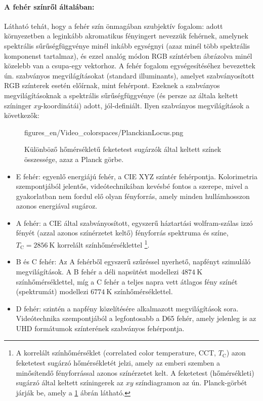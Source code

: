\paragraph{A fehér színről általában:\\}
Látható tehát, hogy a fehér szín önmagában szubjektív fogalom: adott környezetben a leginkább akromatikus fényingert nevezzük fehérnek, amelynek spektrális sűrűségfüggvénye minél inkább egységnyi (azaz minél több spektrális komponenst tartalmaz), és ezzel analóg módon RGB színtérben ábrázolva minél közelebb van a csupa-egy vektorhoz.
A fehér fogalom egységesítéséhez bevezettek ún. szabványos megvilágításokat (standard illuminants), amelyet szabványosított RGB  színterek esetén előírnak, mint fehérpont.
Ezeknek a szabványos megvilágításoknak a spektrális sűrűségfüggvénye (és persze az általa keltett színinger $xy$-koordinátái) adott, jól-definiált.
Ilyen szabványos megvilágítások a következők:
\begin{figure}[]
	\centering
	\begin{minipage}[c]{0.6\textwidth}
	\begin{overpic}[width = 0.9\columnwidth ]{figures_en/Video_colorspaces/PlanckianLocus.png}
	\end{overpic} \end{minipage}\hfill
	\begin{minipage}[c]{0.4\textwidth}
	\caption{Különböző hőmérsékletű feketetest sugárzók által keltett színek összessége, azaz a Planck görbe.}
	\label{Fig:planck}  \end{minipage}
\end{figure}
\begin{itemize}
\item E fehér: egyenlő energiájú fehér, a CIE XYZ színtér fehérpontja. Kolorimetria szempontjából jelentős, videótechnikában kevésbé fontos a szerepe, mivel a gyakorlatban nem fordul elő olyan fényforrás, amely minden hullámhosszon azonos energiával sugároz.
\item A fehér: a CIE által szabványosított, egyszerű háztartási wolfram-szálas izzó fényét (azzal azonos színérzetet keltő) fényforrás spektruma és színe, $T_{\mathrm{C}} = 2856~\mathrm{K}$ korrelált színhőmérséklettel \footnote{A korrelált színhőmérséklet (correlated color temperature, CCT, $T_{\mathrm{C}}$) azon feketetest sugárzó hőmérsékletét jelzi, amely az emberi szemben a minősítendő fényforrással azonos színérzetet kelt.
A feketetest (hőmérsékleti) sugárzó által keltett színingerek az $xy$ színdiagramon az ún. Planck-görbét járják be, amely a \ref{Fig:planck} ábrán látható.}.
\item B és C fehér: Az A fehérből egyszerű szűréssel nyerhető, napfényt szimuláló megvilágítások.
A B fehér a déli napsütést modellezi $4874~\mathrm{K}$ színhőmérséklettel, míg a C fehér a teljes napra vett átlagos fény színét (spektrumát) modellezi $6774~\mathrm{K}$ színhőmérséklettel.
\item D fehér: szintén a napfény közelítésére alkalmazott megvilágítások sora.
Videótechnika szempontjából a legfontosabb a D65 fehér, amely jelenleg is az UHD formátumok színterének szabványos fehérpontja.
\end{itemize}

